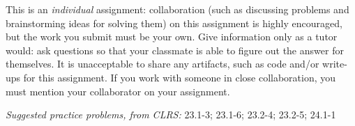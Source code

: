 \documentclass[letterpaper,11pt]{article}
\begin{document}


This is an \emph{individual} assignment: collaboration (such as discussing problems and brainstorming ideas for solving them) on this assignment is highly encouraged, but the work you submit must be your own. Give information only as a tutor would: ask questions so that your classmate is able to figure out the answer for themselves. It is unacceptable to share any artifacts, such as code and/or write-ups for this assignment. If you work with someone in close collaboration, you must mention your collaborator on your assignment.

\emph{Suggested practice problems, from CLRS:} 23.1-3; 23.1-6; 23.2-4; 23.2-5; 24.1-1
\end{document}
